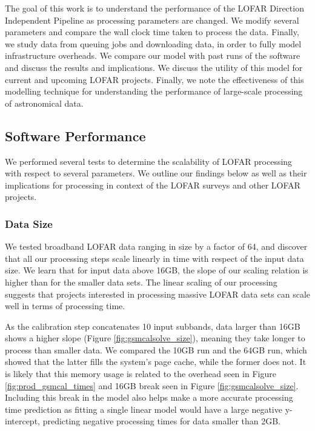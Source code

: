 
The goal of this work is to understand the performance of the LOFAR Direction Independent Pipeline as processing parameters are changed. We modify several parameters and compare the wall clock time taken to process the data. Finally, we study data from queuing jobs and downloading data, in order to fully model infrastructure overheads. We compare our model with past runs of the software and discuss the results and implications. We discuss the utility of this model for current and upcoming LOFAR projects. Finally, we note the effectiveness of this modelling technique for understanding the performance of large-scale processing of astronomical data.

\subsection{Software Performance}

We performed several tests to determine the scalability of LOFAR processing with respect to several parameters. We outline our findings below as well as their implications for processing in context of the LOFAR surveys and other LOFAR projects. 

\subsubsection{Data Size}
We tested broadband LOFAR data ranging in size by a factor of 64, and discover that all our processing steps scale linearly in time with respect of the input data size. We learn that for input data above 16GB, the slope of our scaling relation is higher than for the smaller data sets. The linear scaling of our processing suggests that projects interested in processing massive LOFAR data sets can scale well in terms of processing time. 

As the calibration step concatenates 10 input subbands, data larger than 16GB shows a higher slope (Figure \ref{fig:gsmcalsolve_size}), meaning they take longer to process than smaller data. We compared the 10GB run and the 64GB run, which showed that the latter fills the system's page cache, while the former does not. It is likely that this memory usage is related to the overhead seen in Figure \ref{fig:prod_gsmcal_times} and 16GB break seen in Figure \ref{fig:gsmcalsolve_size}. Including this break in the model also helps make a more accurate processing time prediction as fitting a single linear model would have a large negative y-intercept, predicting negative processing times for data smaller than 2GB. 

